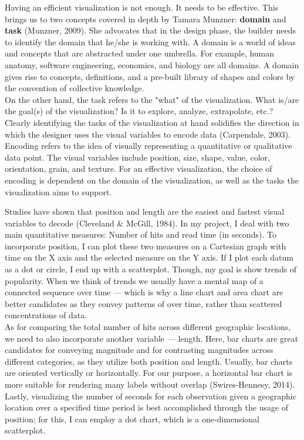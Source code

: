 \documentclass[12pt]{article}
\begin{document}
Having an efficient visualization is not enough. It needs to be effective. This brings us to two concepts covered in depth by Tamara Munzner: \textbf{domain} and \textbf{task} (Munzner, 2009). She advocates that in the design phase, the builder needs to identify the domain that he/she is working with. A domain is a world of ideas and concepts that are abstracted under one umbrella. For example, human anatomy, software engineering, economics, and biology are all domains. A domain gives rise to concepts, definitions, and a pre-built library of shapes and colors by the convention of collective knowledge. \\
On the other hand, the task refers to the "what" of the visualization. What is/are the goal(s) of the visualization? Is it to explore, analyze, extrapolate, etc.? Clearly identifying the tasks of the visualization at hand solidifies the direction in which the designer uses the visual variables to encode data (Carpendale, 2003). Encoding refers to the idea of visually representing a quantitative or qualitative data point. The visual variables include position, size, shape, value, color, orientation, grain, and texture. For an effective visualization, the choice of encoding is dependent on the domain of the visualization, as well as the tasks the visualization aims to support. 

Studies have shown that position and length are the easiest and fastest visual variables to decode (Cleveland \& McGill, 1984). In my project, I deal with two main quantitative measures: Number of hits and read time (in seconds). To incorporate position, I can plot these two measures on a Cartesian graph with time on the X axis and the selected measure on the Y axis. If I plot each datum as a dot or circle, I end up with a scatterplot. Though, my goal is show trends of popularity. When we think of trends we usually have a mental map of a connected sequence over time --- which is why a line chart and area chart are better candidates as they convey patterns of over time, rather than scattered concentrations of data. \\
\noindent As for comparing the total number of hits across different geographic locations, we need to also incorporate another variable --- length. Here, bar charts are great candidates for conveying magnitude and for contrasting magnitudes across different categories, as they utilize both position and length. Usually, bar charts are oriented vertically or horizontally. For our purpose, a horizontal bar chart is more suitable for rendering many labels without overlap (Swires-Hennesy, 2014). Lastly, visualizing the number of seconds for each observation given a geographic location over a specified time period is best accomplished through the usage of position; for this, I can employ a dot chart, which is a one-dimensional scatterplot. 
\end{document}
